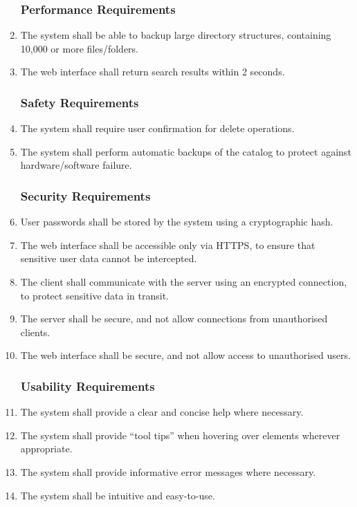 \begin{enumerate}

\renewcommand{\theenumi}{\arabic{enumi}}
\renewcommand{\labelenumi}{\textsc{NFuncReq}$\theenumi$.}

\subsubsection{Performance Requirements}

    \item The system shall be able to backup large directory structures,
        containing 10,000 or more files/folders.
    \item The web interface shall return search results within 2 seconds.

\subsubsection{Safety Requirements}

    \item The system shall require user confirmation for delete operations.
    \item The system shall perform automatic backups of the catalog to protect
        against hardware/software failure.

\subsubsection{Security Requirements}

    \item User passwords shall be stored by the system using a cryptographic
        hash.
    \item The web interface shall be accessible only via HTTPS, to ensure that
        sensitive user data cannot be intercepted.
    \item The client shall communicate with the server using an encrypted
        connection, to protect sensitive data in transit.
    \item The server shall be secure, and not allow connections from
        unauthorised clients.
    \item The web interface shall be secure, and not allow access to
        unauthorised users.

\subsubsection{Usability Requirements}

    \item The system shall provide a clear and concise help where necessary.
    \item The system shall provide ``tool tips'' when hovering over elements
        wherever appropriate.
    \item The system shall provide informative error messages where necessary.
    \item The system shall be intuitive and easy-to-use.

\end{enumerate}


